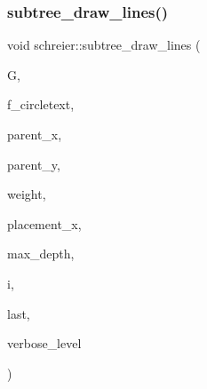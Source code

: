 \subsubsection{\texorpdfstring{subtree\+\_\+draw\+\_\+lines()}{subtree\_draw\_lines()}}
{\footnotesize\ttfamily void schreier\+::subtree\+\_\+draw\+\_\+lines (\begin{DoxyParamCaption}\item[{\mbox{\hyperlink{classmp__graphics}{mp\+\_\+graphics}} \&}]{G,  }\item[{\mbox{\hyperlink{galois_8h_a09fddde158a3a20bd2dcadb609de11dc}{I\+NT}}}]{f\+\_\+circletext,  }\item[{\mbox{\hyperlink{galois_8h_a09fddde158a3a20bd2dcadb609de11dc}{I\+NT}}}]{parent\+\_\+x,  }\item[{\mbox{\hyperlink{galois_8h_a09fddde158a3a20bd2dcadb609de11dc}{I\+NT}}}]{parent\+\_\+y,  }\item[{\mbox{\hyperlink{galois_8h_a09fddde158a3a20bd2dcadb609de11dc}{I\+NT}} $\ast$}]{weight,  }\item[{\mbox{\hyperlink{galois_8h_a09fddde158a3a20bd2dcadb609de11dc}{I\+NT}} $\ast$}]{placement\+\_\+x,  }\item[{\mbox{\hyperlink{galois_8h_a09fddde158a3a20bd2dcadb609de11dc}{I\+NT}}}]{max\+\_\+depth,  }\item[{\mbox{\hyperlink{galois_8h_a09fddde158a3a20bd2dcadb609de11dc}{I\+NT}}}]{i,  }\item[{\mbox{\hyperlink{galois_8h_a09fddde158a3a20bd2dcadb609de11dc}{I\+NT}}}]{last,  }\item[{\mbox{\hyperlink{galois_8h_a09fddde158a3a20bd2dcadb609de11dc}{I\+NT}}}]{verbose\+\_\+level }\end{DoxyParamCaption})}

\mbox{\label{classschreier_a701e784ca7d14860c2ce71b3671e7814}} 
